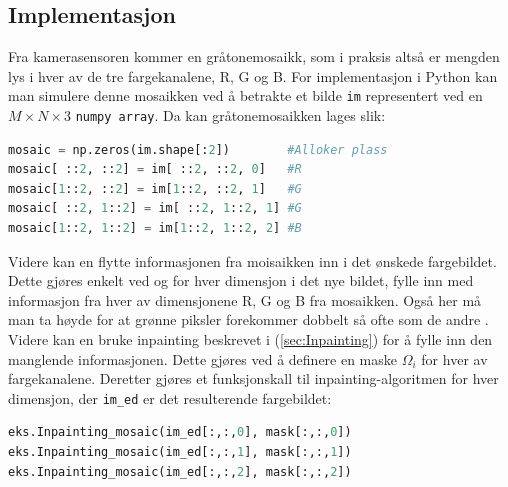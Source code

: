 \subsection{Implementasjon}
Fra kamerasensoren kommer en gråtonemosaikk, som i praksis altså er mengden lys i hver av de tre fargekanalene, R, G og B. For implementasjon i Python kan man simulere denne mosaikken ved å betrakte et bilde \texttt{im} representert ved en $M\times N \times 3$ \texttt{numpy array}. Da kan gråtonemosaikken lages slik:
\begin{lstlisting}[language=Python]
mosaic = np.zeros(im.shape[:2])        #Alloker plass
mosaic[ ::2, ::2] = im[ ::2, ::2, 0]   #R 
mosaic[1::2, ::2] = im[1::2, ::2, 1]   #G
mosaic[ ::2, 1::2] = im[ ::2, 1::2, 1] #G
mosaic[1::2, 1::2] = im[1::2, 1::2, 2] #B
\end{lstlisting}
Videre kan en flytte informasjonen fra moisaikken inn i det ønskede fargebildet. Dette gjøres enkelt ved og for hver dimensjon i det nye bildet, fylle inn med informasjon fra hver av dimensjonene R, G og B fra mosaikken. Også her må man ta høyde for at grønne piksler forekommer dobbelt så ofte som de andre \cite{Demosaic38:online}. Videre kan en bruke inpainting beskrevet i (\ref{sec:Inpainting}) for å fylle inn den manglende informasjonen. Dette gjøres ved å definere en maske $\Omega_i$ for hver av fargekanalene. Deretter gjøres et funksjonskall til inpainting-algoritmen for hver dimensjon, der \texttt{im\_ed} er det resulterende fargebildet:
\begin{lstlisting}[language=Python]
eks.Inpainting_mosaic(im_ed[:,:,0], mask[:,:,0])
eks.Inpainting_mosaic(im_ed[:,:,1], mask[:,:,1])
eks.Inpainting_mosaic(im_ed[:,:,2], mask[:,:,2])
\end{lstlisting}
\begin{figure}
\begin{center}
    
\end{center}
\end{figure}

